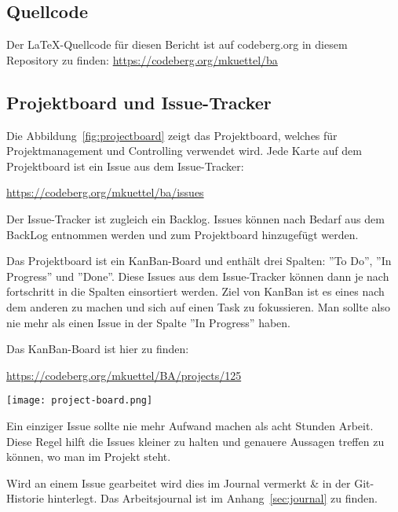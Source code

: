 \subsection{Quellcode}

Der \LaTeX-Quellcode für diesen Bericht ist auf codeberg.org in diesem Repository zu finden:
\url{https://codeberg.org/mkuettel/ba}


\subsection{Projektboard und Issue-Tracker}

Die Abbildung~\ref{fig:projectboard} zeigt das Projektboard, welches für Projektmanagement und Controlling verwendet wird.
Jede Karte auf dem Projektboard ist ein Issue aus dem Issue-Tracker:

\url{https://codeberg.org/mkuettel/ba/issues}

Der Issue-Tracker ist zugleich ein Backlog. Issues können nach Bedarf aus dem BackLog entnommen werden und zum Projektboard hinzugefügt werden.

Das Projektboard ist ein KanBan-Board und enthält drei Spalten: ''To Do'', ''In Progress'' und ''Done''.
Diese Issues aus dem Issue-Tracker können dann je nach fortschritt in die Spalten einsortiert werden. 
Ziel von KanBan ist es eines nach dem anderen zu machen und sich auf einen Task zu fokussieren. Man sollte also nie mehr als einen Issue in der Spalte ''In Progress'' haben.


Das KanBan-Board ist hier zu finden:

\url{https://codeberg.org/mkuettel/BA/projects/125}


\begin{figure*}[ht]
    \texttt{[image: project-board.png]}
    \caption{CodeBerg Project Board}
    \label{fig:projectboard}
\end{figure*}


Ein einziger Issue sollte nie mehr Aufwand machen als acht Stunden Arbeit. Diese Regel hilft die Issues kleiner zu halten und genauere Aussagen treffen zu können, wo man im Projekt steht.

Wird an einem Issue gearbeitet wird dies im Journal vermerkt \& in der Git-Historie hinterlegt.
Das Arbeitsjournal ist im Anhang~\ref{sec:journal} zu finden.


